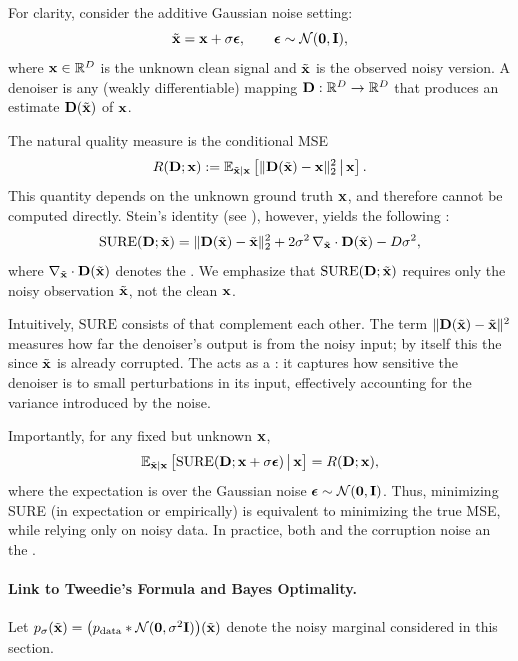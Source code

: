 For clarity, consider the additive Gaussian noise setting:
\[
\tilde{{\mathbf{x}}} = {\mathbf{x}} + \sigma \bm{\epsilon}, 
\qquad \bm{\epsilon} \sim \mathcal{N}(\mathbf{0},{\mathbf{I}}),
\]
where ${\mathbf{x}} \in \mathbb{R}^D$ is the unknown clean signal and $\tilde{{\mathbf{x}}}$ is the observed noisy version. 
A denoiser is any (weakly differentiable) mapping ${\mathbf{D}}:\mathbb{R}^D \to \mathbb{R}^D$ that produces an estimate ${\mathbf{D}}(\tilde{{\mathbf{x}}})$ of ${\mathbf{x}}$.

The natural quality measure is the conditional MSE
\[
R({\mathbf{D}};{\mathbf{x}}) := \mathbb{E}_{\tilde{{\mathbf{x}}}|{\mathbf{x}}}\left[\|{\mathbf{D}}(\tilde{{\mathbf{x}}})-{\mathbf{x}}\|_2^2 \,\big|\, {\mathbf{x}}\right].
\]
This quantity depends on the unknown ground truth ${\mathbf{x}}$, and therefore cannot be computed directly. 
Stein’s identity (see ), however, yields the following :
\begin{align}\label{eq:sure-obj}
    \mathrm{SURE}({\mathbf{D}};\tilde{{\mathbf{x}}})
= \|{\mathbf{D}}(\tilde{{\mathbf{x}}})-\tilde{{\mathbf{x}}}\|_2^2
+ 2\sigma^2\,\nabla_{\tilde{{\mathbf{x}}}}\cdot {\mathbf{D}}(\tilde{{\mathbf{x}}})
- D\sigma^2,
\end{align}
where $\nabla_{\tilde{{\mathbf{x}}}}\cdot {\mathbf{D}}(\tilde{{\mathbf{x}}})$ denotes the . 
We emphasize that $\mathrm{SURE}({\mathbf{D}};\tilde{{\mathbf{x}}})$ requires only the noisy observation $\tilde{{\mathbf{x}}}$, not the clean ${\mathbf{x}}$.

Intuitively, $\mathrm{SURE}$ consists of  that complement each other. 
The term $\|{\mathbf{D}}(\tilde{{\mathbf{x}}})-\tilde{{\mathbf{x}}}\|^2$ measures how far the denoiser’s output is from the noisy input; 
by itself this  the  since $\tilde{{\mathbf{x}}}$ is already corrupted. 
The  acts as a : it captures how sensitive the denoiser is to small perturbations in its input, 
effectively accounting for the variance introduced by the noise.


Importantly, for any fixed but unknown ${\mathbf{x}}$,
\[
\mathbb{E}_{\tilde{{\mathbf{x}}}|{\mathbf{x}}}\left[\mathrm{SURE}({\mathbf{D}};{\mathbf{x}}+\sigma{\bm{\epsilon}}) \,\big|\, {\mathbf{x}}\right]
= R({\mathbf{D}};{\mathbf{x}}),
\]
where the expectation is over the Gaussian noise ${\bm{\epsilon}}\sim\mathcal{N}(\bm{0},{\mathbf{I}})$. Thus, minimizing SURE (in expectation or empirically) is equivalent to minimizing the true MSE, 
while relying only on noisy data. 
In practice,  both  and the corruption noise  an  the .

\paragraph{Link to Tweedie’s Formula and Bayes Optimality.}
Let $p_\sigma(\tilde{{\mathbf{x}}}) = \big(p_{\mathrm{data}} * \mathcal{N}(\mathbf{0}, \sigma^2 {\mathbf{I}})\big)(\tilde{{\mathbf{x}}})$ denote the noisy marginal considered in this section.


